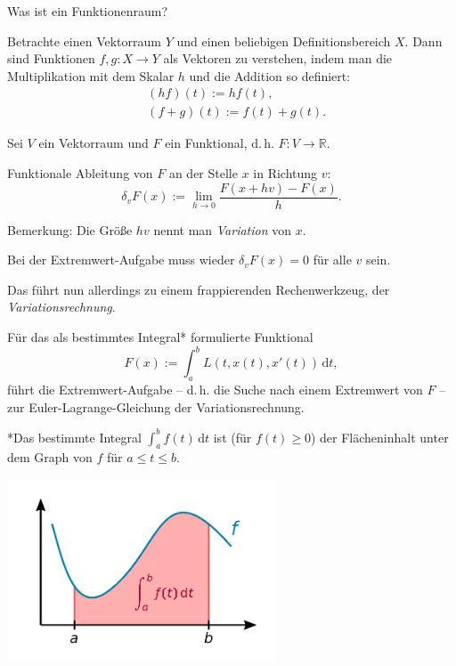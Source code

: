 \documentclass{beamer}
\newcommand{\R}{\mathbb R}
\begin{document}
\begin{frame}
Was ist ein Funktionenraum?\pause

\vspace{0.8em}
Betrachte einen Vektorraum $Y$
und einen beliebigen Definitionsbereich $X$. Dann sind
Funktionen $f,g\colon X\to Y$ als Vektoren zu verstehen, indem
man die Multiplikation mit dem Skalar $h$ und
die Addition so definiert:
\begin{align*}
& (hf)(t) := hf(t),\\
& (f+g)(t) := f(t)+g(t).
\end{align*}
\end{frame}

\begin{frame}
\begin{Definition}
Sei $V$ ein Vektorraum und $F$ ein Funktional, d.\,h. $F\colon V\to\R$.

\vspace{0.6em}
Funktionale Ableitung von $F$ an der Stelle $x$ in Richtung $v$:
\[\delta_v F(x) := \lim_{h\to 0}\frac{F(x+hv)-F(x)}{h}.\]
\end{Definition}\pause

Bemerkung: Die Größe $hv$ nennt man \emph{Variation} von $x$.
\end{frame}

\begin{frame}
Bei der Extremwert-Aufgabe muss wieder $\delta_v F(x)=0$ für alle
$v$ sein.
\pause

\vspace{0.8em}
Das führt nun allerdings zu einem frappierenden Rechenwerkzeug,
der \emph{Variationsrechnung}.
\end{frame}

\begin{frame}
Für das als bestimmtes Integral* formulierte Funktional
\[F(x) := \int_a^b L(t,x(t),x'(t))\,\mathrm dt,\]
führt die Extremwert-Aufgabe -- d.\,h. die Suche nach einem Extremwert
von $F$ -- zur Euler-Lagrange-Gleichung der Variationsrechnung.
\end{frame}

\begin{frame}

{\footnotesize
*Das bestimmte Integral $\int_a^b f(t)\,\mathrm dt$
ist (für $f(t)\ge 0$) der Flächeninhalt unter dem Graph
von $f$ für $a\le t\le b$.}
\begin{center}
\includegraphics[width=80mm]{img/Integral.pdf}
\end{center}
\end{frame}
\end{document}
